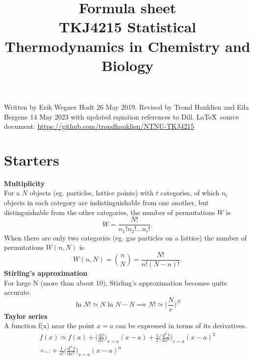\documentclass[8pt]{article}
\numberwithin{equation}{section}
\begin{document}
\author{}
\title{%
Formula sheet\\
\large TKJ4215 Statistical Thermodynamics in Chemistry and Biology}

\maketitle


\begin{multicols}{2}
\noindent Written by Erik Wegner Hodt 26 May 2019. Revised by Trond Hauklien and Eila Bergene 14 May 2023 with updated equation references to Dill. \LaTeX\ source document: \url{https://github.com/trondhauklien/NTNU-TKJ4215}

\section{Starters}
\textbf{Multiplicity}\\
For a $N$ objects (eg. particles, lattice points) with $t$ categories, of which $n_i$ objects in each category are indistinguishable from one another, but distinguishable from the other categories, the number of permutations $W$ is
\begin{equation} \tag{1.21}
W=\frac{N!}{n_1!n_2!\dots n_t!}.
\end{equation}
When there are only two categories (eg. gas particles on a lattice) the number of permutations $W(n,N)$ is
\begin{equation} \tag{1.22}
W(n,N)=\binom{n}{N}=\frac{N!}{n!(N-n)!}.
\end{equation}
\textbf{Stirling's approximation}\\
For large N (more than about 10), Stirling's approximation becomes quite accurate. 
\begin{equation} \tag{B.3}
\ln{N!}\simeq N\ln{N}-N \implies N!\simeq \bigg(\frac{N}{e} \bigg)^{N}
\end{equation}
\textbf{Taylor series}\\
A function f(x) near the point $x=a$ can be expressed in terms of its derivatives. 
\begin{equation}\tag{A.1}
\begin{split} 
f(x)\simeq f(a)+\bigg(\frac{\mathrm{d}f}{\mathrm{d}x}\bigg)_{x=a}(x-a)+\frac{1}{2}\bigg(\frac{\mathrm{d}^{2}f}{\mathrm{d}x^{2}}\bigg)_{x=a}(x-a)^2\\+...+\frac{1}{n!}\bigg(\frac{\mathrm{d}^{n}f}{\mathrm{d}x^{n}}\bigg)_{x=a}(x-a)^{n}
\end{split}
\end{equation}

\end{multicols}
\end{document}

